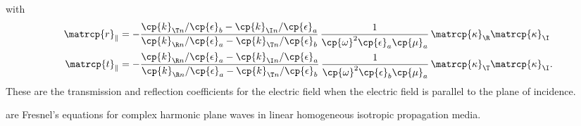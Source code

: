 with
\begin{align}
    \matrcp{r}_\parallel
    &=
    -
    \frac{
        \cp{k}_{\T n} / \cp{\epsilon}_b   -   \cp{k}_{\I n} / \cp{\epsilon}_a
    }{
        \cp{k}_{\R n} / \cp{\epsilon}_a   -   \cp{k}_{\T n} / \cp{\epsilon}_b
    }
    \,
    \frac{1}{
        \cp{\omega}^2 \cp{\epsilon}_a \cp{\mu}_a
    }
    \,
    \matrcp{\kappa}_\R \matrcp{\kappa}_\I
    \label{eq:complex_fresnel_rp}
    \\
    \matrcp{t}_\parallel
    &=
    -
    \frac{
        \cp{k}_{\R n} / \cp{\epsilon}_a   -   \cp{k}_{\I n} / \cp{\epsilon}_a
    }{
        \cp{k}_{\R n} / \cp{\epsilon}_a   -   \cp{k}_{\T n} / \cp{\epsilon}_b
    }
    \,
    \frac{1}{
        \cp{\omega}^2 \cp{\epsilon}_b \cp{\mu}_a
    }
    \,
    \matrcp{\kappa}_\T \matrcp{\kappa}_\I
    \text{.}
    \label{eq:complex_fresnel_tp}
\end{align}
These are the transmission and reflection coefficients for the electric field
when the electric field is parallel to the plane of incidence.

are Fresnel's equations for complex harmonic plane waves in linear homogeneous isotropic propagation media.

